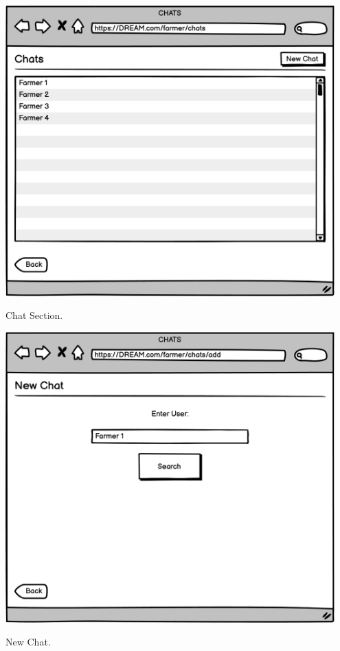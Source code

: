 \vspace{0.5cm}
\begin{minipage}{.5\textwidth}
	\centering
	\includegraphics[width=0.95\textwidth]{Images/Mockup/Farmer/17FarmerChat.png}
	\captionsetup{type=figure}
	\caption{Chat Section.}
\end{minipage}%
\begin{minipage}{.5\textwidth}
	\centering
	\includegraphics[width=0.95\textwidth]{Images/Mockup/Farmer/18FarmerChatAdd.png}
	\captionsetup{type=figure}
	\caption{New Chat.}
\end{minipage}
